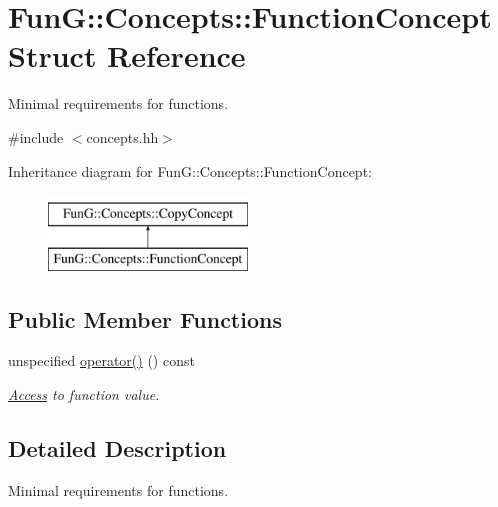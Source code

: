 \hypertarget{structFunG_1_1Concepts_1_1FunctionConcept}{\section{\-Fun\-G\-:\-:\-Concepts\-:\-:\-Function\-Concept \-Struct \-Reference}
\label{structFunG_1_1Concepts_1_1FunctionConcept}
}


\-Minimal requirements for functions.  




{\ttfamily \#include $<$concepts.\-hh$>$}

\-Inheritance diagram for \-Fun\-G\-:\-:\-Concepts\-:\-:\-Function\-Concept\-:\begin{figure}[H]
\begin{center}
\leavevmode
\includegraphics[height=2.000000cm]{structFunG_1_1Concepts_1_1FunctionConcept}
\end{center}
\end{figure}
\subsection*{\-Public \-Member \-Functions}
\begin{DoxyCompactItemize}
\item 
unspecified \hyperlink{structFunG_1_1Concepts_1_1FunctionConcept_ae09a34291f803c3139038e944a4e399d}{operator()} () const 
\begin{DoxyCompactList}\small\item\em \hyperlink{namespaceFunG_1_1Access}{\-Access} to function value. \end{DoxyCompactList}\end{DoxyCompactItemize}


\subsection{\-Detailed \-Description}
\-Minimal requirements for functions. 

